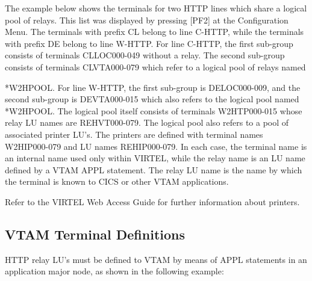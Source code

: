 \documentclass[letterpaper,10pt,english]{sphinxmanual}
\begin{document}
The example below shows the terminals for two HTTP lines which share a logical pool of relays. This list was displayed by pressing {[}PF2{]} at the Configuration Menu. The terminals with prefix CL belong to line C-HTTP, while the terminals with prefix DE belong to line W-HTTP. For line C-HTTP, the first sub-group consists of terminals CLLOC000-049 without a relay. The second sub-group consists of terminals CLVTA000-079 which refer to a logical pool of relays named

*W2HPOOL. For line W-HTTP, the first sub-group is DELOC000-009, and the second sub-group is DEVTA000-015 which also refers to the logical pool named *W2HPOOL. The logical pool itself consists of terminals W2HTP000-015 whose relay LU names are REHVT000-079. The logical pool also refers to a pool of associated printer LU’s. The printers are defined with
terminal names W2HIP000-079 and LU names REHIP000-079. In each case, the terminal name is an internal name used only within VIRTEL, while the relay name is an LU name defined by a VTAM APPL statement. The relay LU name is the name by which the terminal is known to CICS or other VTAM applications.






Refer to the VIRTEL Web Access Guide for further information about printers.


\subsection{VTAM Terminal Definitions}
\label{\detokenize{connectivity_guide:index-13}}\label{\detokenize{connectivity_guide:vtam-terminal-definitions}}
HTTP relay LU’s must be defined to VTAM by means of APPL statements in an application major node, as shown in the following example:
\end{document}
